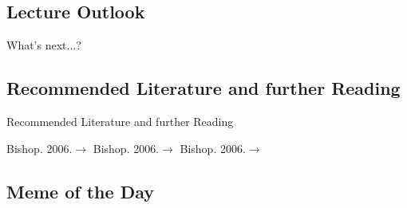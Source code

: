 \subsection{Lecture Outlook}

\begin{frame}{What's next...?}{}
\end{frame}


\subsection{Recommended Literature and further Reading}

\begin{frame}{Recommended Literature and further Reading}{}
	\footnotesize
	\begin{thebibliography}{2}
			{Bishop. 2006.}{$\rightarrow$ \href{http://users.isr.ist.utl.pt/~wurmd/Livros/school/Bishop\%20-\%20Pattern\%20Recognition\%20And\%20Machine\%20Learning\%20-\%20Springer\%20\%202006.pdf}{}}
			{Bishop. 2006.}{$\rightarrow$ \href{http://users.isr.ist.utl.pt/~wurmd/Livros/school/Bishop\%20-\%20Pattern\%20Recognition\%20And\%20Machine\%20Learning\%20-\%20Springer\%20\%202006.pdf}{}}
			{Bishop. 2006.}{$\rightarrow$ \href{http://users.isr.ist.utl.pt/~wurmd/Livros/school/Bishop\%20-\%20Pattern\%20Recognition\%20And\%20Machine\%20Learning\%20-\%20Springer\%20\%202006.pdf}{}}
	\end{thebibliography}
\end{frame}


\subsection{Meme of the Day}

